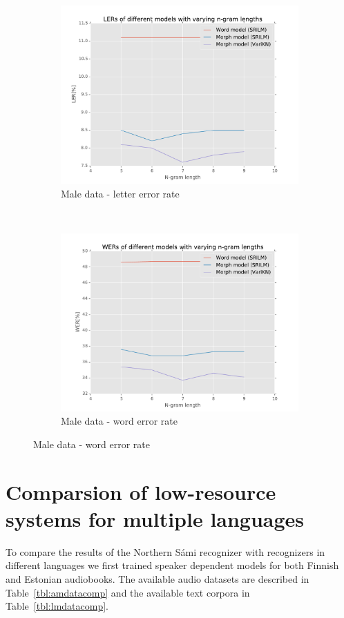 \documentclass[b5paper]{article}
\newcommand{\ns}{{Northern Sámi }}
\begin{document}
\begin{figure}[!h]
\begin{subfigure}[b]{.4\textwidth}
\includegraphics[width=\textwidth]{figures/smeM-complete_wikipedia-ler}
\caption{Male data - letter error rate}
\end{subfigure}~
\begin{subfigure}[b]{.4\textwidth}
\includegraphics[width=\textwidth]{figures/smeM-complete_wikipedia-wer}
\caption{Male data - word error rate}
\end{subfigure}

\end{figure}

\section{Comparsion of low-resource systems for multiple languages}
\label{sec:compexp}
To compare the results of the \ns recognizer with recognizers in different languages we first trained speaker dependent models for both Finnish and Estonian audiobooks. The available audio datasets are described in Table~\ref{tbl:amdatacomp} and the available text corpora in Table~\ref{tbl:lmdatacomp}.
\end{document}
